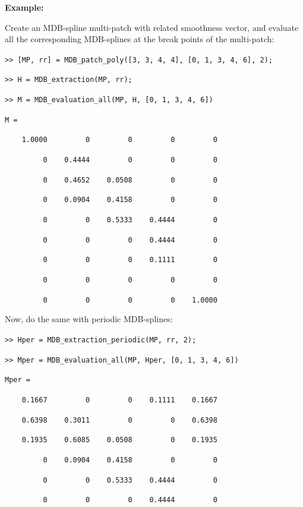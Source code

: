 \documentclass[10pt]{./acmtrans2e}
\newenvironment{example}
{\vspace*{0.1cm}
\noindent \textbf{Example:} \vspace*{0.15cm}

\setlength{\parskip}{0.5ex plus 0.5exminus 0.2 ex}
}
{\medskip
}
\begin{document}
\begin{example}
\noindent Create an MDB-spline multi-patch with related smoothness vector, and evaluate all the corresponding MDB-splines at the break points of the multi-patch: 
\medskip

\texttt{>> [MP, rr] = MDB\_patch\_poly([3, 3, 4, 4], [0, 1, 3, 4, 6], 2);}

\texttt{>> H = MDB\_extraction(MP, rr);}

\texttt{>> M = MDB\_evaluation\_all(MP, H, [0, 1, 3, 4, 6])}

\texttt{M =}

\texttt{\ \ \ \ 1.0000\ \ \ \ \ \ \ \ \ 0\ \ \ \ \ \ \ \ \ 0\ \ \ \ \ \ \ \ \ 0\ \ \ \ \ \ \ \ \ 0}

\texttt{\ \ \ \ \ \ \ \ \ 0\ \ \ \ 0.4444\ \ \ \ \ \ \ \ \ 0\ \ \ \ \ \ \ \ \ 0\ \ \ \ \ \ \ \ \ 0}

\texttt{\ \ \ \ \ \ \ \ \ 0\ \ \ \ 0.4652\ \ \ \ 0.0508\ \ \ \ \ \ \ \ \ 0\ \ \ \ \ \ \ \ \ 0}

\texttt{\ \ \ \ \ \ \ \ \ 0\ \ \ \ 0.0904\ \ \ \ 0.4158\ \ \ \ \ \ \ \ \ 0\ \ \ \ \ \ \ \ \ 0}

\texttt{\ \ \ \ \ \ \ \ \ 0\ \ \ \ \ \ \ \ \ 0\ \ \ \ 0.5333\ \ \ \ 0.4444\ \ \ \ \ \ \ \ \ 0}

\texttt{\ \ \ \ \ \ \ \ \ 0\ \ \ \ \ \ \ \ \ 0\ \ \ \ \ \ \ \ \ 0\ \ \ \ 0.4444\ \ \ \ \ \ \ \ \ 0}

\texttt{\ \ \ \ \ \ \ \ \ 0\ \ \ \ \ \ \ \ \ 0\ \ \ \ \ \ \ \ \ 0\ \ \ \ 0.1111\ \ \ \ \ \ \ \ \ 0}

\texttt{\ \ \ \ \ \ \ \ \ 0\ \ \ \ \ \ \ \ \ 0\ \ \ \ \ \ \ \ \ 0\ \ \ \ \ \ \ \ \ 0\ \ \ \ \ \ \ \ \ 0}

\texttt{\ \ \ \ \ \ \ \ \ 0\ \ \ \ \ \ \ \ \ 0\ \ \ \ \ \ \ \ \ 0\ \ \ \ \ \ \ \ \ 0\ \ \ \ 1.0000}

\medskip
\noindent Now, do the same with periodic MDB-splines:
\medskip

\texttt{>> Hper = MDB\_extraction\_periodic(MP, rr, 2);}

\texttt{>> Mper = MDB\_evaluation\_all(MP, Hper, [0, 1, 3, 4, 6])}

\pagebreak

\texttt{Mper =}

\texttt{\ \ \ \ 0.1667\ \ \ \ \ \ \ \ \ 0\ \ \ \ \ \ \ \ \ 0\ \ \ \ 0.1111\ \ \ \ 0.1667}

\texttt{\ \ \ \ 0.6398\ \ \ \ 0.3011\ \ \ \ \ \ \ \ \ 0\ \ \ \ \ \ \ \ \ 0\ \ \ \ 0.6398}

\texttt{\ \ \ \ 0.1935\ \ \ \ 0.6085\ \ \ \ 0.0508\ \ \ \ \ \ \ \ \ 0\ \ \ \ 0.1935}

\texttt{\ \ \ \ \ \ \ \ \ 0\ \ \ \ 0.0904\ \ \ \ 0.4158\ \ \ \ \ \ \ \ \ 0\ \ \ \ \ \ \ \ \ 0}

\texttt{\ \ \ \ \ \ \ \ \ 0\ \ \ \ \ \ \ \ \ 0\ \ \ \ 0.5333\ \ \ \ 0.4444\ \ \ \ \ \ \ \ \ 0}

\texttt{\ \ \ \ \ \ \ \ \ 0\ \ \ \ \ \ \ \ \ 0\ \ \ \ \ \ \ \ \ 0\ \ \ \ 0.4444\ \ \ \ \ \ \ \ \ 0}
\end{example}
\end{document}
